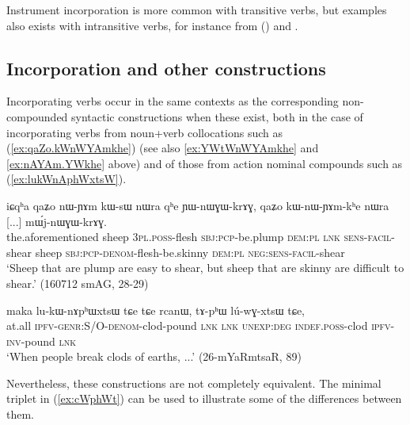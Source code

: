 Instrument incorporation is more common with transitive verbs, but examples also exists with intransitive verbs, for instance  from  () and .


\subsection{Incorporation and other constructions} \label{sec:incorp.vs.other}
Incorporating verbs occur in the same contexts as the corresponding non-compounded syntactic constructions when these exist, both in the case of incorporating verbs from noun+verb collocations such as  (\ref{ex:qaZo.kWnWYAmkhe}) (see also \ref{ex:YWtWnWYAmkhe} and \ref{ex:nAYAm.YWkhe} above) and of those from action nominal compounds such as  (\ref{ex:lukWnAphWxtsW}).

\begin{exe}
\ex \label{ex:qaZo.kWnWYAmkhe}
\gll iɕqʰa qaʑo nɯ-ɲɤm kɯ-sɯ nɯra qʰe ɲɯ-nɯɣɯ-krɤɣ, qaʑo kɯ-nɯ-ɲɤm-kʰe nɯra [...] mɯ́j-nɯɣɯ-krɤɣ. \\
the.aforementioned sheep \textsc{3pl}.\textsc{poss}-flesh \textsc{sbj}:\textsc{pcp}-be.plump \textsc{dem}:\textsc{pl} \textsc{lnk} \textsc{sens}-\textsc{facil}-shear sheep \textsc{sbj}:\textsc{pcp}-\textsc{denom}-flesh-be.skinny \textsc{dem}:\textsc{pl} {  } \textsc{neg}:\textsc{sens}-\textsc{facil}-shear \\
\glt `Sheep that are plump are easy to shear, but sheep that are skinny are difficult to shear.' (160712 smAG, 28-29)
\end{exe}

\begin{exe}
\ex \label{ex:lukWnAphWxtsW}
\gll maka lu-kɯ-nɤpʰɯxtsɯ tɕe tɕe rcanɯ, tɤ-pʰɯ lú-wɣ-xtsɯ tɕe, \\
at.all \textsc{ipfv}-\textsc{genr}:S/O-\textsc{denom}-clod-pound \textsc{lnk} \textsc{lnk} \textsc{unexp}:\textsc{deg} \textsc{indef}.\textsc{poss}-clod \textsc{ipfv}-\textsc{inv}-pound \textsc{lnk} \\
\glt `When people break clods of earths, ...' (26-mYaRmtsaR, 89)
\end{exe}

Nevertheless, these constructions are not completely equivalent. The minimal triplet in (\ref{ex:cWphWt}) can be used to illustrate some of the differences between them.

